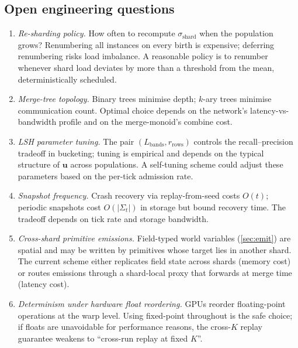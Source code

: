 \documentclass[journal,onecolumn,11pt]{IEEEtran}
\theoremstyle{definition}
\begin{document}
\subsection{Open engineering questions}

\begin{enumerate}[leftmargin=1.5em,nosep]
\item \emph{Re-sharding policy.} How often to recompute $\sigma_{\mathrm{shard}}$ when the population grows? Renumbering all instances on every birth is expensive; deferring renumbering risks load imbalance. A reasonable policy is to renumber whenever shard load deviates by more than a threshold from the mean, deterministically scheduled.
\item \emph{Merge-tree topology.} Binary trees minimise depth; $k$-ary trees minimise communication count. Optimal choice depends on the network's latency-vs-bandwidth profile and on the merge-monoid's combine cost.
\item \emph{LSH parameter tuning.} The pair $(L_{\mathrm{bands}}, r_{\mathrm{rows}})$ controls the recall--precision tradeoff in bucketing; tuning is empirical and depends on the typical structure of $\mathbf{u}$ across populations. A self-tuning scheme could adjust these parameters based on the per-tick admission rate.
\item \emph{Snapshot frequency.} Crash recovery via replay-from-seed costs $O(t)$; periodic snapshots cost $O(|\Sigma_t|)$ in storage but bound recovery time. The tradeoff depends on tick rate and storage bandwidth.
\item \emph{Cross-shard primitive emissions.} Field-typed world variables (\cref{sec:emit}) are spatial and may be written by primitives whose target lies in another shard. The current scheme either replicates field state across shards (memory cost) or routes emissions through a shard-local proxy that forwards at merge time (latency cost).
\item \emph{Determinism under hardware float reordering.} GPUs reorder floating-point operations at the warp level. Using fixed-point throughout is the safe choice; if floats are unavoidable for performance reasons, the cross-$K$ replay guarantee weakens to ``cross-run replay at fixed $K$''.
\end{enumerate}
\end{document}
